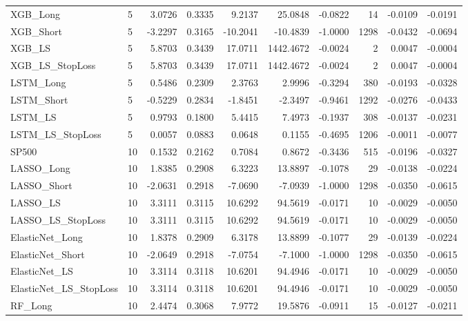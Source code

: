\begin{tabular}{llrrrrrrrr}
\cline{1-10}
XGB\_Long & 5 & 3.0726 & 0.3335 & 9.2137 & 25.0848 & -0.0822 & 14 & -0.0109 & -0.0191 \\
\cline{1-10}
XGB\_Short & 5 & -3.2297 & 0.3165 & -10.2041 & -10.4839 & -1.0000 & 1298 & -0.0432 & -0.0694 \\
\cline{1-10}
XGB\_LS & 5 & 5.8703 & 0.3439 & 17.0711 & 1442.4672 & -0.0024 & 2 & 0.0047 & -0.0004 \\
\cline{1-10}
XGB\_LS\_StopLoss & 5 & 5.8703 & 0.3439 & 17.0711 & 1442.4672 & -0.0024 & 2 & 0.0047 & -0.0004 \\
\cline{1-10}
LSTM\_Long & 5 & 0.5486 & 0.2309 & 2.3763 & 2.9996 & -0.3294 & 380 & -0.0193 & -0.0328 \\
\cline{1-10}
LSTM\_Short & 5 & -0.5229 & 0.2834 & -1.8451 & -2.3497 & -0.9461 & 1292 & -0.0276 & -0.0433 \\
\cline{1-10}
LSTM\_LS & 5 & 0.9793 & 0.1800 & 5.4415 & 7.4973 & -0.1937 & 308 & -0.0137 & -0.0231 \\
\cline{1-10}
LSTM\_LS\_StopLoss & 5 & 0.0057 & 0.0883 & 0.0648 & 0.1155 & -0.4695 & 1206 & -0.0011 & -0.0077 \\
\cline{1-10}
SP500 & 10 & 0.1532 & 0.2162 & 0.7084 & 0.8672 & -0.3436 & 515 & -0.0196 & -0.0327 \\
\cline{1-10}
LASSO\_Long & 10 & 1.8385 & 0.2908 & 6.3223 & 13.8897 & -0.1078 & 29 & -0.0138 & -0.0224 \\
\cline{1-10}
LASSO\_Short & 10 & -2.0631 & 0.2918 & -7.0690 & -7.0939 & -1.0000 & 1298 & -0.0350 & -0.0615 \\
\cline{1-10}
LASSO\_LS & 10 & 3.3111 & 0.3115 & 10.6292 & 94.5619 & -0.0171 & 10 & -0.0029 & -0.0050 \\
\cline{1-10}
LASSO\_LS\_StopLoss & 10 & 3.3111 & 0.3115 & 10.6292 & 94.5619 & -0.0171 & 10 & -0.0029 & -0.0050 \\
\cline{1-10}
ElasticNet\_Long & 10 & 1.8378 & 0.2909 & 6.3178 & 13.8899 & -0.1077 & 29 & -0.0139 & -0.0224 \\
\cline{1-10}
ElasticNet\_Short & 10 & -2.0649 & 0.2918 & -7.0754 & -7.1000 & -1.0000 & 1298 & -0.0350 & -0.0615 \\
\cline{1-10}
ElasticNet\_LS & 10 & 3.3114 & 0.3118 & 10.6201 & 94.4946 & -0.0171 & 10 & -0.0029 & -0.0050 \\
\cline{1-10}
ElasticNet\_LS\_StopLoss & 10 & 3.3114 & 0.3118 & 10.6201 & 94.4946 & -0.0171 & 10 & -0.0029 & -0.0050 \\
\cline{1-10}
RF\_Long & 10 & 2.4474 & 0.3068 & 7.9772 & 19.5876 & -0.0911 & 15 & -0.0127 & -0.0211 \\

\end{tabular}

